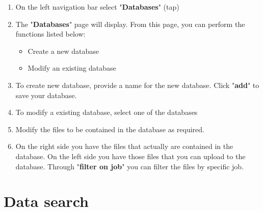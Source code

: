 \documentclass[12pt]{report}
\begin{document}
\begin{enumerate}
 
\item On the left navigation bar select "\textbf{Databases}" (tap)
\item The "\textbf{Databases}" page will display. From this page, you can perform the functions listed below:
\begin{itemize}
    \item Create a new database
    \item Modify an existing database
\end{itemize}
\item To create new database, provide a name for the new database. Click
"\textbf{add}" to save your database.

\begin{center}
\begin{figure}[H]
\end{figure}
\end{center}

\item To modify a existing database, select one of the databases 

\begin{center}
\begin{figure}[H]
\end{figure}
\end{center}

\item Modify the files to be contained in the database as required.

\begin{center}
\begin{figure}[H]
\end{figure}
\end{center}

\item On the right side you have the files that actually are contained in the
database. On the left side you have those files that you can upload to the
database. Through "\textbf{filter on job}" you can filter the files by specific job.

\end{enumerate}

\newpage
\section{Data search}
\newline
\end{document}
